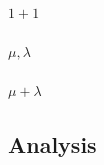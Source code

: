\documentclass{scrartcl}
\begin{document}
\paragraph{$1+1$}

\paragraph{$\mu,\lambda$}

\paragraph{$\mu +\lambda$}


\subsection{Analysis}
\end{document}
